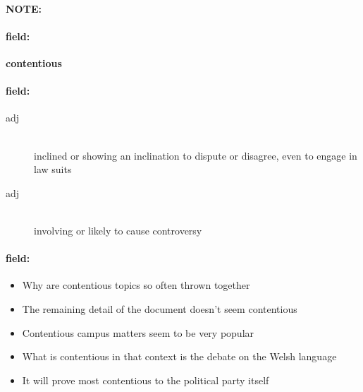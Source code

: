 \documentclass[12pt]{article}
\newenvironment{note}{\paragraph{NOTE:}}{}
\newenvironment{field}{\paragraph{field:}}{}
\begin{document}
\begin{note}
\begin{field}
\textbf{\large contentious}
\end{field}


\begin{field}
\begin{description}
\item[adj] \hfill \\ 
inclined or showing an inclination to dispute or disagree, even to engage in law suits

\item[adj] \hfill \\ 
involving or likely to cause controversy

\end{description}
\end{field}

\begin{field}
\begin{itemize}
\item Why are contentious topics so often thrown together
\item The remaining detail of the document doesn't seem contentious
\item Contentious campus matters seem to be very popular
\item What is contentious in that context is the debate on the Welsh language
\item It will prove most contentious to the political party itself
\end{itemize}
\end{field}
\end{note}
\end{document}
